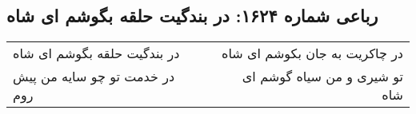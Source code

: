 \begin{center}
\section*{رباعی شماره ۱۶۲۴: در بندگیت حلقه بگوشم ای شاه}
\label{sec:1624}
\begin{longtable}{l p{0.5cm} r}
در بندگیت حلقه بگوشم ای شاه
&&
در چاکریت به جان بکوشم ای شاه
\\
در خدمت تو چو سایه من پیش روم
&&
تو شیری و من سیاه گوشم ای شاه
\\
\end{longtable}
\end{center}
